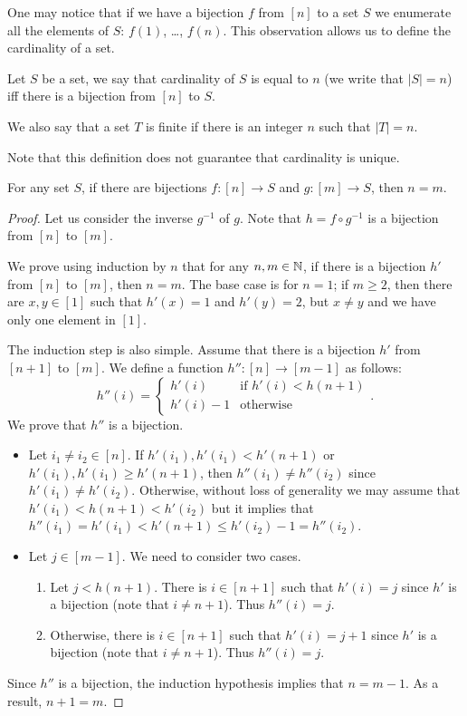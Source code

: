 One may notice that if we have a bijection $f$ from $[n]$ to a set $S$ we
enumerate all the elements of $S$: $f(1)$, \dots, $f(n)$.
This observation allows us to define the cardinality of a set.
\begin{definition}
  Let $S$ be a set, we say that cardinality of $S$ is equal to $n$ (we write
  that $|S| = n$) iff there is a bijection from $[n]$ to $S$.

  We also say that a set $T$ is finite if there is an integer $n$ such that
  $|T| = n$.
\end{definition}

Note that this definition does not guarantee that cardinality is unique.
\begin{theorem}
  For any set $S$, if there are bijections $f : [n] \to S$ and $g : [m] \to S$,
  then $n = m$.
\end{theorem}
\begin{proof}
  Let us consider the inverse $g^{-1}$ of $g$. Note that $h = f \circ g^{-1}$
  is a bijection from $[n]$ to $[m]$.

  We prove using induction by $n$ that for any $n, m \in \mathbb{N}$,
  if there is a bijection $h'$ from $[n]$ to $[m]$, then $n = m$.
  The base case is for $n = 1$; if $m \ge 2$,
  then there are $x, y \in [1]$ such that $h'(x) = 1$ and $h'(y) = 2$, but
  $x \neq y$ and we have only one element in $[1]$.

  The induction step is also simple. Assume that there is a bijection $h'$ from
  $[n + 1]$ to $[m]$. We define a function $h'' : [n] \to [m - 1]$ as follows:
  \[
    h''(i) =
    \begin{cases}
      h'(i) & \text{if } h'(i) < h(n + 1) \\
      h'(i) - 1 & \text{otherwise}
    \end{cases}.
  \]
  We prove that $h''$ is a bijection.
  \begin{itemize}
    \item Let $i_1 \neq i_2 \in [n]$. If $h'(i_1), h'(i_1) < h'(n + 1)$ or
      $h'(i_1), h'(i_1) \ge h'(n + 1)$, then $h''(i_1) \neq h''(i_2)$ since
      $h'(i_1) \neq h'(i_2)$. Otherwise, without loss of generality we
      may assume that $h'(i_1) < h(n + 1) < h'(i_2)$ but it implies that
      $h''(i_1) = h'(i_1) < h'(n + 1) \le h'(i_2) - 1 = h''(i_2)$.
    \item Let $j \in [m - 1]$. We need to consider two cases.
      \begin{enumerate}
        \item Let $j < h(n + 1)$. There is $i \in [n + 1]$ such that
          $h'(i) = j$ since $h'$ is a bijection (note that $i \neq n + 1$).
          Thus $h''(i) = j$.
        \item Otherwise, there is $i \in [n + 1]$ such that
          $h'(i) = j + 1$ since $h'$ is a bijection (note that $i \neq n + 1$).
          Thus $h''(i) = j$.
      \end{enumerate}
  \end{itemize}
  Since $h''$ is a bijection, the induction hypothesis implies that $n = m - 1$.
  As a result, $n + 1 = m$.
\end{proof}


